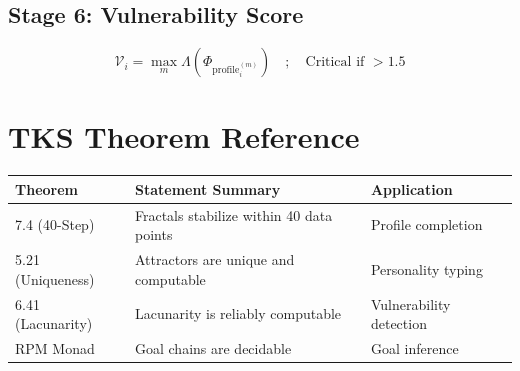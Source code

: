 \documentclass[11pt,twoside]{book}
\renewcommand{\arraystretch}{1.2}
\newcommand{\Lacunarity}{\Lambda}
\newcommand{\ProfileFrac}{\Phi_{\mathrm{profile}}}
\newcommand{\VulnScore}{\mathcal{V}}
\begin{document}
\section{Stage 6: Vulnerability Score}
\begin{equation}
    \VulnScore_i = \max_m \Lacunarity(\ProfileFrac_i^{(m)}) \quad ; \quad \text{Critical if } > 1.5
\end{equation}

\chapter{TKS Theorem Reference}
\label{app:theorems}

\begin{center}
\renewcommand{\arraystretch}{1.3}
\begin{tabularx}{\textwidth}{l|X|l}
\toprule
\textbf{Theorem} & \textbf{Statement Summary} & \textbf{Application} \\
\midrule
7.4 (40-Step) & Fractals stabilize within 40 data points & Profile completion \\
5.21 (Uniqueness) & Attractors are unique and computable & Personality typing \\
6.41 (Lacunarity) & Lacunarity is reliably computable & Vulnerability detection \\
RPM Monad & Goal chains are decidable & Goal inference \\
\bottomrule
\end{tabularx}
\end{center}

\end{document}

